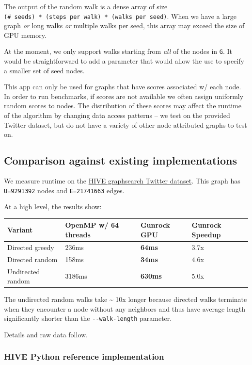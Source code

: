 \documentclass[10pt,oneside]{memoir}
\begin{document}
The output of the random walk is a dense array of size
\texttt{(\#\ seeds)\ *\ (steps\ per\ walk)\ *\ (walks\ per\ seed)}. When
we have a large graph \emph{or} long walks \emph{or} multiple walks per
seed, this array may exceed the size of GPU memory.

At the moment, we only support walks starting from \emph{all} of the
nodes in \texttt{G}. It would be straightforward to add a parameter that
would allow the use to specify a smaller set of seed nodes.

This app can only be used for graphs that have scores associated w/ each
node. In order to run benchmarks, if scores are not available we often
assign uniformly random scores to nodes. The distribution of these
scores may affect the runtime of the algorithm by changing data access
patterns -- we test on the provided Twitter dataset, but do not have a
variety of other node attributed graphs to test on.

\hypertarget{comparison-against-existing-implementations-3}{%
\subsection{Comparison against existing
implementations}\label{comparison-against-existing-implementations-3}}

We measure runtime on the
\href{https://hiveprogram.com/data/_v0/graph_search/}{HIVE graphsearch
Twitter dataset}. This graph has \texttt{\textbar{}U\textbar{}=9291392}
nodes and \texttt{\textbar{}E\textbar{}=21741663} edges.

At a high level, the results show:

\begin{longtable}[]{@{}llll@{}}
\toprule
Variant & OpenMP w/ 64 threads & Gunrock GPU & Gunrock
Speedup\tabularnewline
\midrule
\endhead
Directed greedy & 236ms & \textbf{64ms} & 3.7x\tabularnewline
Directed random & 158ms & \textbf{34ms} & 4.6x\tabularnewline
Undirected random & 3186ms & \textbf{630ms} & 5.0x\tabularnewline
\bottomrule
\end{longtable}

The undirected random walks take \textasciitilde{} 10x longer because
directed walks terminate when they encounter a node without any
neighbors and thus have average length significantly shorter than the
\texttt{-\/-walk-length} parameter.

Details and raw data follow.

\hypertarget{hive-python-reference-implementation}{%
\subsubsection{HIVE Python reference
implementation}\label{hive-python-reference-implementation}}
\end{document}
